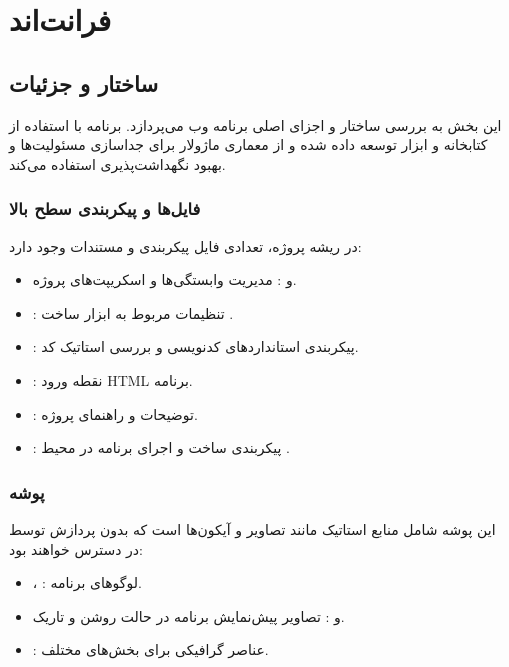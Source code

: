 \chapter{فرانت‌اند}
    \section{ساختار و جزئیات }
    
    این بخش به بررسی ساختار و اجزای اصلی برنامه وب می‌پردازد. برنامه با استفاده از کتابخانه  و ابزار  توسعه داده شده و از معماری ماژولار برای جداسازی مسئولیت‌ها و بهبود نگهداشت‌پذیری استفاده می‌کند.
    
    \subsection{فایل‌ها و پیکربندی سطح بالا}
    در ریشه پروژه، تعدادی فایل پیکربندی و مستندات وجود دارد:
    \begin{itemize}
    	\item \textbf{} و \textbf{}: مدیریت وابستگی‌ها و اسکریپت‌های پروژه.
    	\item \textbf{}: تنظیمات مربوط به ابزار ساخت .
    	\item \textbf{}: پیکربندی استانداردهای کدنویسی و بررسی استاتیک کد.
    	\item \textbf{}: نقطه ورود HTML برنامه.
    	\item \textbf{}: توضیحات و راهنمای پروژه.
    	\item \textbf{}: پیکربندی ساخت و اجرای برنامه در محیط .
    \end{itemize}
    
    \subsection{پوشه }
    این پوشه شامل منابع استاتیک مانند تصاویر و آیکون‌ها است که بدون پردازش توسط  در دسترس خواهند بود:
    \begin{itemize}
    	\item {}، : لوگوهای برنامه.
    	\item {} و : تصاویر پیش‌نمایش برنامه در حالت روشن و تاریک.
    	\item {}: عناصر گرافیکی برای بخش‌های مختلف.
    \end{itemize}
    
